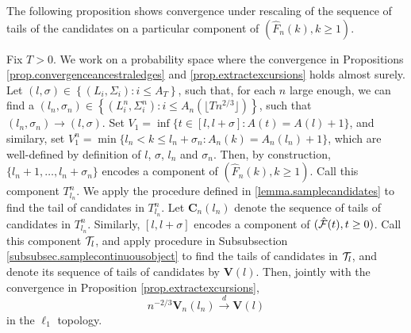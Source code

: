 The following proposition shows convergence under rescaling of the sequence of tails of the candidates on a particular component of $(\hat{F}_n(k),k\geq 1)$. 
\begin{proposition}\label{prop.convergencestartingpointscandidates}
Fix $T>0$. We work on a probability space where the convergence in Propositions \ref{prop.convergenceancestraledges} and \ref{prop.extractexcursions} holds almost surely. Let $(l,\sigma)\in \left\{(L_i,\Sigma_i):i\leq A_T\right\}$, such that, for each $n$ large enough, we can find a $(l_n,\sigma_n)\in\left\{(L_i^n,\Sigma_i^n):i\leq A_n\left(\lfloor Tn^{2/3}\rfloor\right)\right\}$, such that $(l_n,\sigma_n)\to (l,\sigma)$. Set $V_1=\inf\{t\in [l,l+\sigma]:A(t)=A(l)+1\}$, and similary, set $V_1^n=\min\{l_n<k\leq l_n+\sigma_n:A_n(k)=A_n(l_n)+1\}$, which are well-defined by definition of $l$, $\sigma$, $l_n$ and $\sigma_n$.  Then, by construction, $\{l_n+1,\dots,l_n+\sigma_n\}$ encodes a component of $(\hat{F}_n(k),k\geq 1)$. Call this component $T^n_{l_n}$. We apply the procedure defined in \ref{lemma.samplecandidates} to find the tail of candidates in $T^n_{l_n}$. Let $\mathbf{C}_n(l_n)$ denote the sequence of tails of candidates in $T^n_{l_n}$. Similarly, $[l,l+\sigma]$ encodes a component of $(\hat{{\mathcal F}}(t),t\geq 0)$. Call this component ${\mathcal T}_l$, and apply procedure in Subsubsection \ref{subsubsec.samplecontinuousobject} to find the tails of candidates in ${\mathcal T}_l$, and denote its sequence of tails of candidates by $\mathbf{V}(l)$. Then, jointly with the convergence in Proposition \ref{prop.extractexcursions}, 
$$n^{-2/3}\mathbf{V}_n(l_n)\overset{d}{\to}\mathbf{V}(l)$$
in the $\ell_1$ topology.
\end{proposition}
